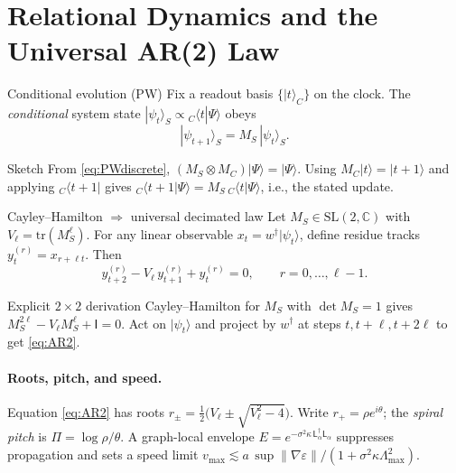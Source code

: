 \documentclass[11pt]{article}
\newcommand{\Id}{\mathsf{I}}
\newcommand{\M}{M}
\newcommand{\Lap}{\mathsf{L}_{\alpha}}
\begin{document}
\section{Relational Dynamics and the Universal AR(2) Law}
\begin{myprop}{Conditional evolution (PW)}
Fix a readout basis $\{|t\rangle_C\}$ on the clock. The \emph{conditional} system state
$|\psi_t\rangle_S \propto {}_C\!\langle t|\Psi\rangle$ obeys
\begin{equation}
|\psi_{t+1}\rangle_S = \M_S\,|\psi_t\rangle_S .
\end{equation}
\end{myprop}

\begin{proofbox}{Sketch}
From \eqref{eq:PWdiscrete}, $(\M_S\otimes \M_C)|\Psi\rangle=|\Psi\rangle$.
Using $\M_C|t\rangle=|t+1\rangle$ and applying ${}_C\!\langle t+1|$ gives
${}_C\!\langle t+1|\Psi\rangle = \M_S\,{}_C\!\langle t|\Psi\rangle$, i.e., the stated update.
\end{proofbox}

\begin{mythm}{Cayley--Hamilton $\Rightarrow$ universal decimated law}
Let $\M_S\in\mathrm{SL}(2,\mathbb C)$ with $V_\ell=\mathrm{tr}(\M_S^\ell)$.
For any linear observable $x_t=w^\dagger|\psi_t\rangle$, define residue tracks
$y^{(r)}_t=x_{r+\ell t}$. Then
\begin{equation}
y^{(r)}_{t+2} - V_\ell\,y^{(r)}_{t+1} + y^{(r)}_{t}=0,\qquad r=0,\dots,\ell-1.
\label{eq:AR2}
\end{equation}
\end{mythm}

\begin{proofbox}{Explicit $2\times2$ derivation}
Cayley--Hamilton for $\M_S$ with $\det \M_S=1$ gives $\M_S^{2\ell}-V_\ell \M_S^\ell+\Id=0$.
Act on $|\psi_t\rangle$ and project by $w^\dagger$ at steps $t, t+\ell, t+2\ell$ to get
\eqref{eq:AR2}.
\end{proofbox}

\paragraph{Roots, pitch, and speed.}
Equation \eqref{eq:AR2} has roots $r_\pm=\tfrac{1}{2}\big(V_\ell\pm\sqrt{V_\ell^2-4}\big)$.
Write $r_+=\rho e^{i\theta}$; the \emph{spiral pitch} is $\Pi=\log\rho/\theta$.
A graph-local envelope $E=e^{-\sigma^2\kappa\,\Lap^\dagger\Lap}$ suppresses propagation and
sets a speed limit $v_{\max}\lesssim a\,\sup\|\nabla\varepsilon\|/(1+\sigma^2\kappa\Lambda_{\max}^2)$.
\end{document}
